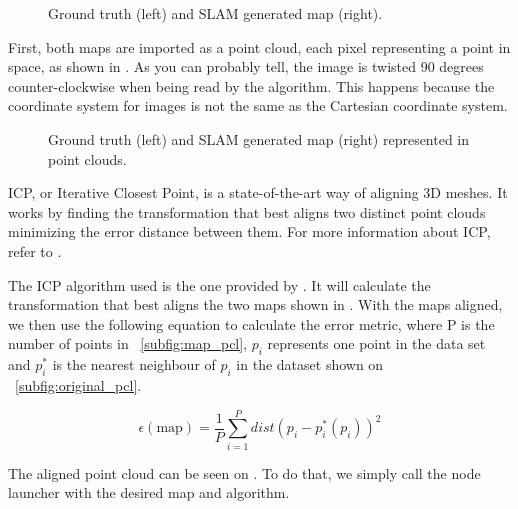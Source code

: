 \begin{figure}[!ht]
     \centering
     \hspace{2cm}
     \caption{Ground truth (left) and SLAM generated map (right).}
     \label{fig:reference_map_icp}
\end{figure}

First, both maps are imported as a point cloud, each pixel representing a point in space, as shown in . As you can probably tell, the image is twisted 90 degrees counter-clockwise when being read by the algorithm. This happens because the coordinate system for images is not the same as the Cartesian coordinate system.

\begin{figure}[!ht]
     \centering
     \hspace{0cm}
     \caption{Ground truth (left) and SLAM generated map (right) represented in point clouds.}
     \label{fig:point_cloud}
\end{figure}

ICP, or Iterative Closest Point, is a state-of-the-art way of aligning 3D meshes. It works by finding the transformation that best aligns two distinct point clouds minimizing the error distance between them. For more information about ICP, refer to \citeauthor{besl1992method}.

The ICP algorithm used is the one provided by \citeauthor{flannigan2019}. It will calculate the transformation that best aligns the two maps shown in . With the maps aligned, we then use the following equation to calculate the error metric, where P is the number of points in \figurename~\ref{subfig:map_pcl}, $p_i$ represents one point in the data set and $p_i^*$ is the nearest neighbour of $p_i$ in the dataset shown on \figurename~\ref{subfig:original_pcl}.

\begin{equation}
\epsilon(\text{map}) = \frac{1}{P} \sum_{i=1}^P dist(p_i - p_i^*(p_i))^2
\end{equation}

The aligned point cloud can be seen on . To do that, we simply call the node launcher with the desired map and algorithm.

